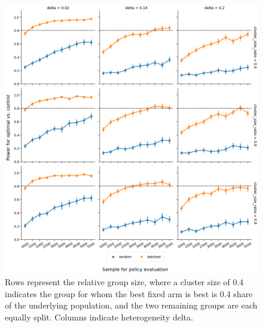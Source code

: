 \documentclass[letterpaper, 12pt, parskip=full,DIV=10]{scrartcl}
\begin{document}
\begin{figure}[ht]
\centering
\includegraphics[width=.9\textwidth]{figures/power_against_control_policy_forest.png}
\caption{
Rows represent the relative group size, where a cluster size of 0.4 indicates the group for whom the best fixed arm is best is 0.4 share of the underlying population, and the two remaining groups are each equally split.  Columns indicate heterogeneity delta. }
\label{fig:power_control}
\end{figure}\FloatBarrier
\end{document}

